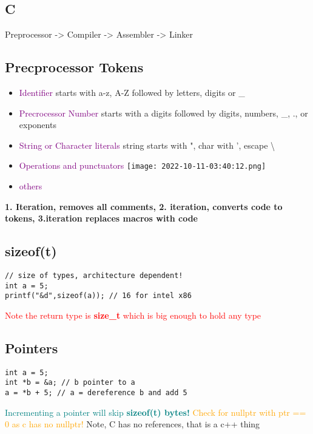 \documentclass[main.tex,fontsize=8pt,paper=a4,paper=landscape,DIV=calc,]{scrartcl}
\begin{document}
\begin{multicols*}{4}
\lstset{
    language=c,
    style=code,
}
\section{C}
Preprocessor -> Compiler -> Assembler -> Linker

\subsection{Precprocessor Tokens}
\begin{itemize}
\item \textcolor{purple}{Identifier}\newline
starts with a-z, A-Z followed by letters, digits or \_
\item \textcolor{purple}{Precrocessor Number}\newline
  starts with a digits followed by digits, numbers, \_, ., or exponents
\item \textcolor{purple}{String or Character literals}\newline
  string starts with ", char with ', escape \textbackslash 
\item \textcolor{purple}{Operations and punctuators}\newline
  \texttt{[image: 2022-10-11-03:40:12.png]}
\item \textcolor{purple}{others}
\end{itemize} 

\textbf{1. Iteration, removes all comments, 2. iteration, converts code to tokens, 3.iteration replaces macros with code}

\subsection{sizeof(t)}
\vspace{-2.5mm}
\begin{lstlisting}
// size of types, architecture dependent!
int a = 5;
printf("&d",sizeof(a)); // 16 for intel x86
\end{lstlisting}
\vspace{2mm}
\textcolor{red}{Note the return type is \textbf{size\_t} which is big enough to hold any type}

\subsection{Pointers}
\vspace{-2.5mm}
\begin{lstlisting}
int a = 5;
int *b = &a; // b pointer to a 
a = *b + 5; // a = dereference b and add 5
\end{lstlisting}
\vspace{2mm}
\textcolor{teal}{Incrementing a pointer will skip \textbf{sizeof(t) bytes!}}
\textcolor{orange}{Check for nullptr with ptr == 0 as c has no nullptr!}
Note, C has no references, that is a c++ thing


\end{multicols*}
\end{document}

